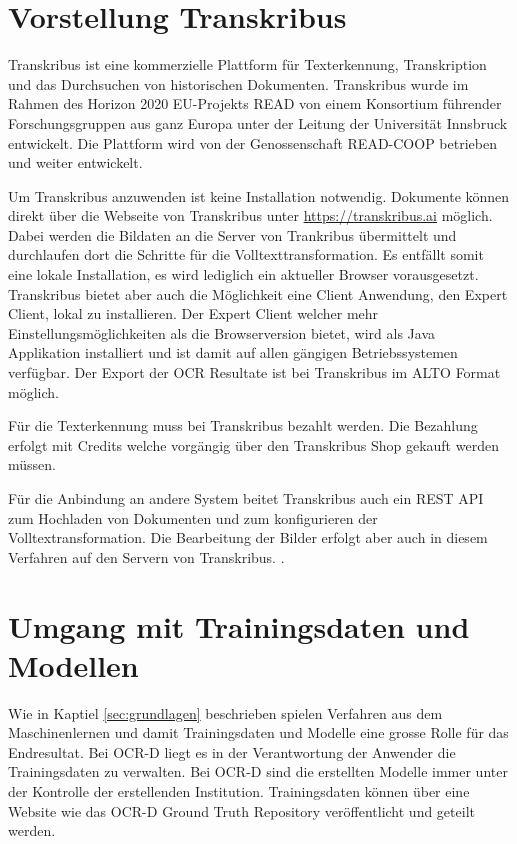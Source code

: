 \documentclass[a4paper,oneside, 12pt]{report}
\begin{document}
\section{Vorstellung Transkribus}
Transkribus ist eine kommerzielle Plattform für Texterkennung, Transkription und das Durchsuchen von historischen Dokumenten. Transkribus wurde im Rahmen des Horizon 2020 EU-Projekts READ von einem Konsortium führender Forschungsgruppen aus ganz Europa unter der Leitung der Universität Innsbruck entwickelt. Die Plattform wird von der Genossenschaft READ-COOP betrieben und weiter entwickelt. \cite{readcoopabout} 

Um Transkribus anzuwenden ist keine Installation notwendig. Dokumente können direkt über die Webseite von Transkribus unter \url{https://transkribus.ai} möglich. Dabei werden die Bildaten an die Server von Trankribus übermittelt und durchlaufen dort die Schritte für die Volltexttransformation. Es entfällt somit eine lokale Installation, es wird lediglich ein aktueller Browser vorausgesetzt. Transkribus bietet aber auch die Möglichkeit eine Client Anwendung, den Expert Client, lokal zu installieren. Der Expert Client welcher mehr Einstellungsmöglichkeiten als die Browserversion bietet, wird als Java Applikation installiert und ist damit auf allen gängigen Betriebssystemen verfügbar. Der Export der OCR Resultate ist bei Transkribus im ALTO Format möglich. \cite{transkribus}

Für die Texterkennung muss bei Transkribus bezahlt werden. Die Bezahlung erfolgt mit Credits welche vorgängig über den Transkribus Shop gekauft werden müssen. \cite{transkribuspricing}

Für die Anbindung an andere System beitet Transkribus auch ein REST API zum Hochladen von Dokumenten und zum konfigurieren der Volltextransformation. Die Bearbeitung der Bilder erfolgt aber auch in diesem Verfahren auf den Servern von Transkribus. \cite{transkribusapi}. 

\section{Umgang mit Trainingsdaten und Modellen}
Wie in Kaptiel \ref{sec:grundlagen} beschrieben spielen Verfahren aus dem Maschinenlernen und damit Trainingsdaten und Modelle eine grosse Rolle für das Endresultat. Bei OCR-D liegt es in der Verantwortung der Anwender die Trainingsdaten zu verwalten. Bei OCR-D sind die erstellten Modelle immer unter der Kontrolle der erstellenden Institution. Trainingsdaten können über eine Website wie das OCR-D Ground Truth Repository veröffentlicht und geteilt werden. \cite{ocrdgtrepo}
\end{document}
